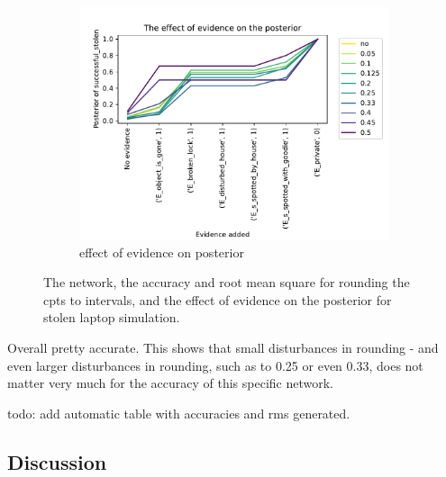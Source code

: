 \begin{figure}[h]
\begin{subfigure}{.5\textwidth}
\includegraphics[width=\linewidth]{../experiments/StolenLaptop/plots/posterior_StolenLaptop.pdf}
\caption{effect of evidence on posterior}
\label{laptopPosterior}

\end{subfigure}
\caption{The network, the accuracy and root mean square for rounding the cpts to intervals, and the effect of evidence on the posterior for stolen laptop simulation.}
\label{laptop}
\end{figure}





Overall pretty accurate. This shows that small disturbances in rounding - and even larger disturbances in rounding, such as to 0.25 or even 0.33, does not matter very much for the accuracy of this specific network. 

{\color{red} todo: add automatic table with accuracies and rms generated}.


\subsection{Discussion}

